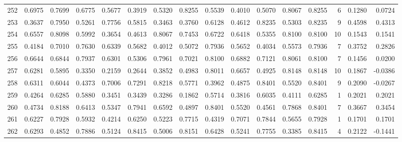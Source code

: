 \begin{tabular}{lrrrrrrrrrrrrrrr}
252 &      0.6975 &  0.7699 &  0.6775 &  0.5677 &  0.3919 &  0.5320 &  0.8255 &  0.5539 &  0.4010 &  0.5070 &   0.8067 &     0.8255 &      6 &                    0.1280 &                     0.0724 \\
253 &      0.3637 &  0.7950 &  0.5261 &  0.7756 &  0.5815 &  0.3463 &  0.3760 &  0.6128 &  0.4612 &  0.8235 &   0.5303 &     0.8235 &      9 &                    0.4598 &                     0.4313 \\
254 &      0.6557 &  0.8098 &  0.5992 &  0.3654 &  0.4613 &  0.8067 &  0.7453 &  0.6722 &  0.6418 &  0.5355 &   0.8100 &     0.8100 &     10 &                    0.1543 &                     0.1541 \\
255 &      0.4184 &  0.7010 &  0.7630 &  0.6339 &  0.5682 &  0.4012 &  0.5072 &  0.7936 &  0.5652 &  0.4034 &   0.5573 &     0.7936 &      7 &                    0.3752 &                     0.2826 \\
256 &      0.6644 &  0.6844 &  0.7937 &  0.6301 &  0.5306 &  0.7961 &  0.7021 &  0.8100 &  0.6882 &  0.7121 &   0.8061 &     0.8100 &      7 &                    0.1456 &                     0.0200 \\
257 &      0.6281 &  0.5895 &  0.3350 &  0.2159 &  0.2644 &  0.3852 &  0.4983 &  0.8011 &  0.6657 &  0.4925 &   0.8148 &     0.8148 &     10 &                    0.1867 &                    -0.0386 \\
258 &      0.6311 &  0.6044 &  0.4373 &  0.7006 &  0.7291 &  0.8218 &  0.5771 &  0.3962 &  0.4875 &  0.8401 &   0.5520 &     0.8401 &      9 &                    0.2090 &                    -0.0267 \\
259 &      0.4264 &  0.6285 &  0.5880 &  0.3451 &  0.3439 &  0.3286 &  0.1862 &  0.5714 &  0.3816 &  0.6035 &   0.4111 &     0.6285 &      1 &                    0.2021 &                     0.2021 \\
260 &      0.4734 &  0.8188 &  0.6413 &  0.5347 &  0.7941 &  0.6592 &  0.4897 &  0.8401 &  0.5520 &  0.4561 &   0.7868 &     0.8401 &      7 &                    0.3667 &                     0.3454 \\
261 &      0.6227 &  0.7928 &  0.5932 &  0.4214 &  0.6250 &  0.5223 &  0.7715 &  0.4319 &  0.7071 &  0.7844 &   0.5655 &     0.7928 &      1 &                    0.1701 &                     0.1701 \\
262 &      0.6293 &  0.4852 &  0.7886 &  0.5124 &  0.8415 &  0.5006 &  0.8151 &  0.6428 &  0.5241 &  0.7755 &   0.3385 &     0.8415 &      4 &                    0.2122 &                    -0.1441 \\

\end{tabular}

